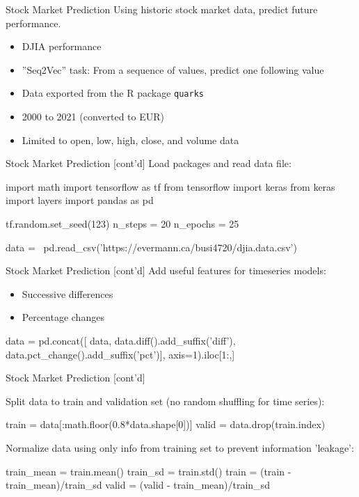 \documentclass[ignorenonframetext,xcolor=x11names]{beamer}
\begin{document}
\begin{frame}[fragile]{Stock Market Prediction}
Using historic stock market data, predict future performance.
\begin{itemize}
   \item DJIA performance
   \item ''Seq2Vec'' task: From a sequence of values, predict one following value
   \item Data exported from the R package \texttt{quarks}
   \item 2000 to 2021 (converted to EUR)
   \item Limited to open, low, high, close, and volume data
\end{itemize}
\end{frame}

\begin{frame}[fragile]{Stock Market Prediction \small [cont'd]}
Load packages and read data file:
\begin{pythoncode}
import math
import tensorflow as tf
from tensorflow import keras
from keras import layers
import pandas as pd

tf.random.set_seed(123)
n_steps = 20
n_epochs = 25

data = \
pd.read_csv('https://evermann.ca/busi4720/djia.data.csv')
\end{pythoncode}
\end{frame}

\begin{frame}[fragile]{Stock Market Prediction \small [cont'd]}
Add useful features for timeseries models:
\begin{itemize}
   \item Successive differences
   \item Percentage changes
\end{itemize}
\begin{pythoncode}
data = pd.concat([
    data,
    data.diff().add_suffix('diff'),
    data.pct_change().add_suffix('pct')],
    axis=1).iloc[1:,]
\end{pythoncode}
\end{frame}

\begin{frame}[fragile]{Stock Market Prediction \small [cont'd]}

Split data to train and validation set (no random shuffling for time series):

\begin{pythoncode}
train = data[:math.floor(0.8*data.shape[0])]
valid = data.drop(train.index)
\end{pythoncode}

Normalize data using only info from training set to prevent information 'leakage':

\begin{pythoncode}
train_mean = train.mean()
train_sd = train.std()
train = (train - train_mean)/train_sd
valid = (valid - train_mean)/train_sd
\end{pythoncode}
\end{frame}
\end{document}
